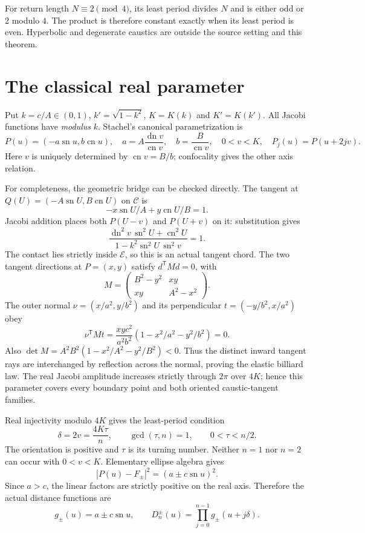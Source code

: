 \documentclass[11pt]{article}
\DeclareMathOperator{\sn}{sn}
\DeclareMathOperator{\cn}{cn}
\DeclareMathOperator{\dn}{dn}
\begin{document}
For return length \(N\equiv2\pmod4\), its least period divides \(N\)
and is either odd or \(2\) modulo \(4\). The product is therefore
constant exactly when its least period is even.
Hyperbolic and degenerate caustics are outside the source setting and
this theorem.

\section{The classical real parameter}
Put \(k=c/A\in(0,1)\), \(k'=\sqrt{1-k^2}\), \(K=K(k)\) and
\(K'=K(k')\). All Jacobi functions have \emph{modulus} \(k\).
Stachel's canonical parametrization
\cite[Theorem~4.3 and (4.9), p.~1614]{stachel} is
\begin{equation}\label{eq:param}
 P(u)=(-a\sn u,b\cn u),\quad
 a=A\frac{\dn v}{\cn v},\quad b=\frac{B}{\cn v},\quad
 0<v<K,\quad P_j(u)=P(u+2jv).
\end{equation}
Here \(v\) is uniquely determined by \(\cn v=B/b\); confocality
gives the other axis relation.

For completeness, the geometric bridge can be checked directly.
The tangent at \(Q(U)=(-A\sn U,B\cn U)\) on \(\mathcal C\) is
\[
 -x\sn U/A+y\cn U/B=1.
\]
Jacobi addition \cite[Section~22.8]{dlmf} places both \(P(U-v)\)
and \(P(U+v)\) on it: substitution gives
\[
 \frac{\dn^2v\,\sn^2U+\cn^2U}
 {1-k^2\sn^2U\,\sn^2v}=1.
\]
The contact lies strictly inside \(\mathcal E\), so this is an
actual tangent chord.
The two tangent directions at \(P=(x,y)\) satisfy
\(d^{\mathsf T}Md=0\), with
\[
 M=\begin{pmatrix}B^2-y^2&xy\\xy&A^2-x^2\end{pmatrix}.
\]
The outer normal \(\nu=(x/a^2,y/b^2)\) and its perpendicular
\(t=(-y/b^2,x/a^2)\) obey
\[
 \nu^{\mathsf T}Mt=\frac{xyc^2}{a^2b^2}
 \left(1-x^2/a^2-y^2/b^2\right)=0.
\]
Also \(\det M=A^2B^2(1-x^2/A^2-y^2/B^2)<0\).
Thus the distinct inward tangent rays are interchanged by reflection
across the normal, proving the elastic billiard law.
The real Jacobi amplitude increases strictly through \(2\pi\) over
\(4K\); hence this parameter covers every boundary point and both
oriented caustic-tangent families.

Real injectivity modulo \(4K\) gives the least-period condition
\begin{equation}\label{eq:closure}
 \delta=2v=\frac{4K\tau}{n},\qquad
 \gcd(\tau,n)=1,\qquad 0<\tau<n/2.
\end{equation}
The orientation is positive and \(\tau\) is its turning number.
Neither \(n=1\) nor \(n=2\) can occur with \(0<v<K\).
Elementary ellipse algebra gives
\[
 |P(u)-F_\pm|^2=(a\pm c\sn u)^2.
\]
Since \(a>c\), the linear factors are strictly positive on the real
axis. Therefore the actual distance functions are
\begin{equation}\label{eq:factor}
 g_\pm(u)=a\pm c\sn u,\qquad
 D_n^\pm(u)=\prod_{j=0}^{n-1}g_\pm(u+j\delta).
\end{equation}
\end{document}
